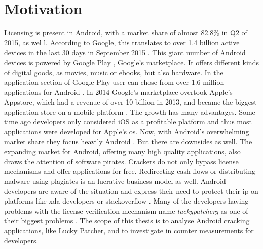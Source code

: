 \section{Motivation}\label{subsection:introduction-motivation}
Licensing is present in Android, with a market share of almost 82.8\% in Q2 of 2015,  as wel \cite{androidShare}l.
According to Google, this translates to over 1.4 billion active devices in the last 30 days in September 2015 \cite{androidDevices}.
This giant number of Android devices is powered by Google Play \cite{googlePlay}, Google's marketplace.
It offers different kinds of digital goods, as movies, music or ebooks, but also hardware.
In the application section of Google Play user can chose from over 1.6 million applications for Android \cite{statistaAppStore}.
In 2014 Google's marketplace overtook Apple's Appstore, which had a revenue of over 10 billion in 2013, and became the biggest application store on a mobile platform \cite{wiwoValue}.
\newline
The growth has many advantages.
Some time ago developers only considered iOS as a profitable platform and thus most applications were developed for Apple's \gls{os}.
Now, with Android's overwhelming market share they focus heavily Android \cite{businessProfit}.
But there are downsides as well.
The expanding market for Android, offering many high quality applications, also draws the attention of software pirates.
Crackers do not only bypass license mechanisms and offer applications for free.
Redirecting cash flows or distributing malware using plagiates is an lucrative business model as well.
Android developers are aware of the situation \cite{developersPiracy} and express their need to protect their \gls{ip} on platforms like xda-developers \cite{xdaPiracy} or stackoverflow \cite{stackoverflowPiracy}.
Many of the developers having problems with the license verification mechanism name \textit{\gls{luckypatcherg}} as one of their biggest problems \cite{stackoverflowLucky}.
\newline
\newline
The scope of this thesis is to analyse Android cracking applications, like Lucky Patcher,  and to investigate in counter measurements for developers.

